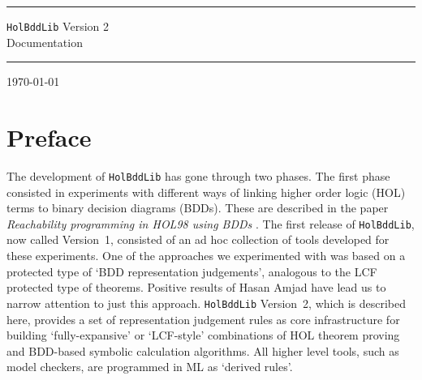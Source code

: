 \documentclass[12pt]{article}
\renewcommand{\t}[1]{\mbox{\tt #1}}
\begin{document}
\thispagestyle{empty}

\hrule height5pt

\begin{flushleft}
{\Huge{\tt HolBddLib} Version 2\\[5mm]
Documentation}
\end{flushleft}

\vspace*{2mm}

\hrule height5pt

\vspace*{1cm}



\vspace*{5mm}

\today

\vfill

{\setlength{\fboxrule}{0.5mm}
\setlength{\fboxsep}{2mm}
}

\vfill

\newpage


\section*{Preface}


The development of {\tt HolBddLib} has gone through two phases.  The
first phase consisted in experiments with different ways of linking
higher order logic (HOL) terms to binary decision diagrams (BDDs).
These are described in the paper {\it Reachability programming in
HOL98 using BDDs\/} \cite{tphols2000-Gordon}. The first release of
\t{HolBddLib}, now called Version~1, consisted of an ad hoc collection
of tools developed for these experiments.  One of the approaches we
experimented with was based on a protected type of `BDD representation
judgements', analogous to the LCF protected type of theorems.
Positive results of Hasan Amjad \cite{Amjad:TPHOLs2001} have lead us
to narrow attention to just this approach. \t{HolBddLib} Version~2,
which is described here, provides a set of representation judgement
rules as core infrastructure for building `fully-expansive' or
`LCF-style' combinations of HOL theorem proving and BDD-based symbolic
calculation algorithms. All higher level tools, such as model
checkers, are programmed in ML as `derived rules'.
\end{document}
